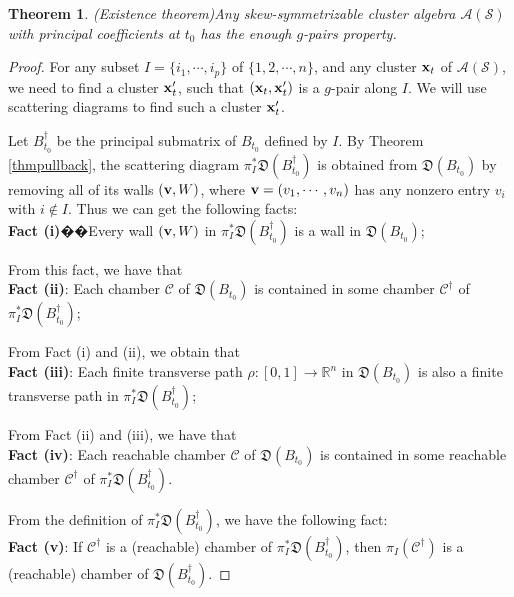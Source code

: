 \documentclass[14pt]{amsart}
\newtheorem{Theorem}{Theorem}[section]
\begin{document}
\begin{Theorem}(Existence theorem)\label{thmenough}
Any skew-symmetrizable cluster algebra $\mathcal A(\mathcal S)$ with principal coefficients at $t_0$ has  the enough $g$-pairs property.
\end{Theorem}
\begin{proof}
For any subset $I=\{i_1,\cdots,i_p\}$ of $\{1,2,\cdots,n\}$, and any cluster ${\bf x}_t$ of $\mathcal A(\mathcal S)$, we need to find a cluster ${\bf x}_t^\prime$, such that $({\bf x}_t,{\bf x}_t^\prime)$ is a $g$-pair along $I$. We will use scattering diagrams to find such a cluster ${\bf x}_t^\prime$.





Let $B_{t_0}^\dag$ be the principal submatrix of $B_{t_0}$ defined by $I$.
By Theorem \ref{thmpullback}, the scattering diagram $\pi_I^{\ast}\mathfrak D(B_{t_0}^\dag)$
is obtained from $\mathfrak D(B_{t_0})$ by removing all of its walls $({\bf v}, W)$, where ${\bf v}=(v_1,\cdots,v_n)$ has any nonzero entry $v_i$ with $i\notin I$. Thus we can get the following facts:\vspace{2mm}
\\
{\bf Fact (i)}��Every wall $({\bf v},W)$ in $\pi_I^{\ast}\mathfrak D(B_{t_0}^\dag)$ is a wall in $\mathfrak D(B_{t_0})$;

From this fact, we have that
\\
{\bf Fact (ii)}: Each chamber $\mathcal C$ of $\mathfrak D(B_{t_0})$ is contained in some chamber ${\mathcal C}^\dag$ of  $\pi_I^{\ast}\mathfrak D(B_{t_0}^\dag)$;

From Fact (i) and  (ii), we obtain that
\\
 {\bf Fact (iii)}: Each  finite transverse path $\rho: [0,1]\rightarrow \mathbb R^n$  in $\mathfrak D(B_{t_0})$ is also a finite transverse path in $\pi_I^{\ast}\mathfrak D(B_{t_0}^\dag)$;

From Fact (ii) and (iii), we have that
\\
{\bf Fact (iv)}: Each reachable chamber $\mathcal C$ of $\mathfrak D(B_{t_0})$ is contained in some reachable chamber ${\mathcal C}^\dag$ of  $\pi_I^{\ast}\mathfrak D(B_{t_0}^\dag)$.

 From the definition of $\pi_I^{\ast}\mathfrak D(B_{t_0}^\dag)$, we have the following fact:
\\
 {\bf Fact (v)}: If  ${\mathcal C}^\dag$ is a (reachable) chamber of  $\pi_I^{\ast}\mathfrak D(B_{t_0}^\dag)$, then $\pi_I({\mathcal C}^\dag)$ is a (reachable) chamber of $\mathfrak D(B_{t_0}^\dag)$.




\end{proof}
\end{document}
